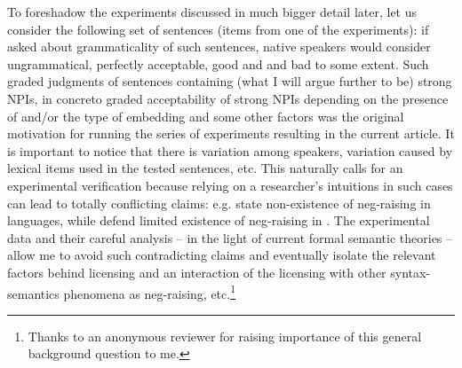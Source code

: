 \documentclass[output=paper, colorlinks, citecolor=brown, newtxmath]{langsci/langscibook}
\begin{document}
To foreshadow the experiments discussed in much bigger detail later, let us consider the following set of  sentences (items from one of the experiments): if asked about grammaticality of such sentences,  native speakers would consider  ungrammatical,  perfectly acceptable,  good and  and  bad to some extent. Such graded judgments of sentences containing (what I will argue further to be) strong NPIs, in concreto graded acceptability of strong NPIs depending on the presence of  and/or the type of embedding  and some other factors was the original motivation for running the series of experiments resulting in the current article. It is important to notice that there is variation among speakers, variation caused by lexical items used in the tested sentences, etc. This naturally calls for an experimental verification because relying on a researcher's intuitions in such cases can lead to totally conflicting claims: e.g. \cite{Boskovic2011} state non-existence of neg-raising in  languages, while \cite{dovcekal2016experimentala} defend limited existence of neg-raising in . The experimental data and their careful analysis -- in the light of current formal semantic theories -- allow me to avoid such contradicting claims and eventually isolate the relevant factors behind  licensing and an interaction of the licensing with other syntax-semantics phenomena as neg-raising, etc.\footnote{Thanks to an anonymous reviewer for raising importance of this general background question to me.}

\ea \label{ex-2-5} 

\z
\z
\end{document}

